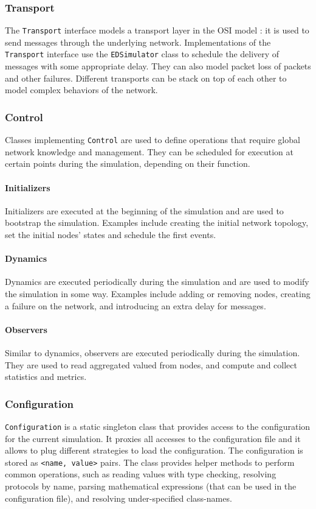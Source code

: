 \subsubsection{Transport}
The \texttt{Transport} interface models a transport layer in the OSI model \cite{wikipedia_osi}:
it is used to send messages through the underlying network.
Implementations of the \texttt{Transport} interface use the \texttt{EDSimulator} class to schedule the delivery of messages with some appropriate delay.
They can also model packet loss of packets and other failures.
Different transports can be stack on top of each other to model complex behaviors of the network.

\subsubsection{Control}
Classes implementing \texttt{Control} are used to define operations that require global network knowledge and management.
They can be scheduled for execution at certain points during the simulation, depending on their function.

\paragraph{Initializers}
Initializers are executed at the beginning of the simulation and are used to bootstrap the simulation.
Examples include creating the initial network topology, set the initial nodes' states and schedule the first events.

\paragraph{Dynamics}
Dynamics are executed periodically during the simulation and are used to modify the simulation in some way.
Examples include adding or removing nodes, creating a failure on the network, and introducing an extra delay for messages.

\paragraph{Observers}
Similar to dynamics, observers are executed periodically during the simulation.
They are used to read aggregated valued from nodes, and compute and collect statistics and metrics.

\subsubsection{Configuration}
\texttt{Configuration} is a static singleton class that provides access to the configuration for the current simulation.
It proxies all accesses to the configuration file and it allows to plug different strategies to load the configuration.
The configuration is stored as \texttt{<name, value>} pairs.
The class provides helper methods to perform common operations, such as reading values with type checking, resolving protocols by name, parsing mathematical expressions (that can be used in the configuration file), and resolving under-specified class-names.

